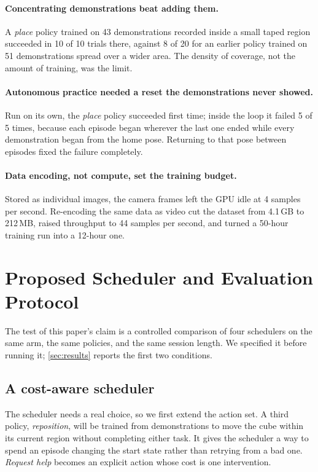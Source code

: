 \documentclass[runningheads]{llncs}
\newcommand{\task}[1]{\textit{#1}}
\begin{document}
\paragraph{Concentrating demonstrations beat adding them.}
A \task{place} policy trained on 43 demonstrations recorded inside a small taped region succeeded in 10 of 10 trials there, against 8 of 20 for an earlier policy trained on 51 demonstrations spread over a wider area. The density of coverage, not the amount of training, was the limit.

\paragraph{Autonomous practice needed a reset the demonstrations never showed.}
Run on its own, the \task{place} policy succeeded first time; inside the loop it failed 5 of 5 times, because each episode began wherever the last one ended while every demonstration began from the home pose. Returning to that pose between episodes fixed the failure completely.

\paragraph{Data encoding, not compute, set the training budget.}
Stored as individual images, the camera frames left the GPU idle at 4 samples per second. Re-encoding the same data as video cut the dataset from 4.1\,GB to 212\,MB, raised throughput to 44 samples per second, and turned a 50-hour training run into a 12-hour one.

\section{Proposed Scheduler and Evaluation Protocol}
\label{sec:eval}

The test of this paper's claim is a controlled comparison of four schedulers on the same arm, the same policies, and the same session length. We specified it before running it; \cref{sec:results} reports the first two conditions.

\subsection{A cost-aware scheduler}
\label{sec:scheduler}

The scheduler needs a real choice, so we first extend the action set. A third policy, \task{reposition}, will be trained from demonstrations to move the cube within its current region without completing either task. It gives the scheduler a way to spend an episode changing the start state rather than retrying from a bad one. \task{Request help} becomes an explicit action whose cost is one intervention.
\end{document}
